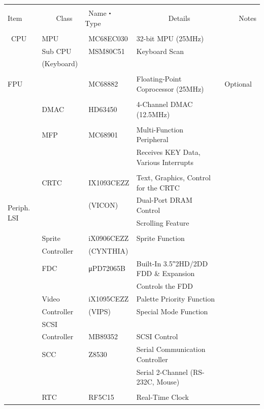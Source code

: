 ﻿\documentclass[twoside,a4paper,12pt]{article}
\begin{document}
\setlength{\tabcolsep}{0.5mm}
\begin{tabular}{|p{13mm}|p{25mm}|p{22mm}|p{73mm}|p{30mm}|}
\hline
& & & &\\[-2mm]
Item & \ \ \ \ Class & \ Name・Type & \ \ \ \ \ \ \ \ \ Details & \ \ \ \ Notes\\
\hline
& & & &\\[-3mm]
\ CPU & MPU & \ MC68EC030 & 32-bit MPU (25MHz) &\\
& Sub CPU & \ MSM80C51 & Keyboard Scan &\\
& (Keyboard) & & &\\
\hline
\multicolumn{2}{|l|}{} & & &\\[-4mm]
\multicolumn{2}{|l|}{FPU} & \ MC68882 & Floating-Point Coprocessor (25MHz) & Optional\\
\hline
\multirow{17}{13mm}{Periph. LSI} & & & &\\[-3mm]
& DMAC & \ HD63450 & 4-Channel DMAC (12.5MHz) &\\
\cline{2-5}
& & & &\\[-3mm]
& MFP & \ MC68901 & Multi-Function Peripheral &\\
& & & Receives KEY Data, Various Interrupts &\\
\cline{2-5}
& & & &\\[-3mm]
& CRTC & \ IX1093CEZZ & Text, Graphics, Control for the CRTC &\\
& & \ (VICON) & Dual-Port DRAM Control &\\
& & & Scrolling Feature &\\[3mm]
\cline{2-5}
& & & &\\[-1mm]
& Sprite & \ iX0906CEZZ & Sprite Function &\\
& Controller & \ (CYNTHIA) & &\\
& FDC & \ μPD72065B & Built-In 3.5″2HD/2DD FDD \& Expansion &\\
& & & Controls the FDD &\\
& Video & \ iX1095CEZZ & Palette Priority Function &\\
& Controller & \ (VIPS) & Special Mode Function &\\
& SCSI & & &\\
& Controller & \ MB89352 & SCSI Control &\\
& SCC & \ Z8530 & Serial Communication Controller &\\
& & & Serial 2-Channel (RS-232C, Mouse) &\\
& & & &\\
& RTC & \ RF5C15 & Real-Time Clock &\\

\end{tabular}
\end{document}
